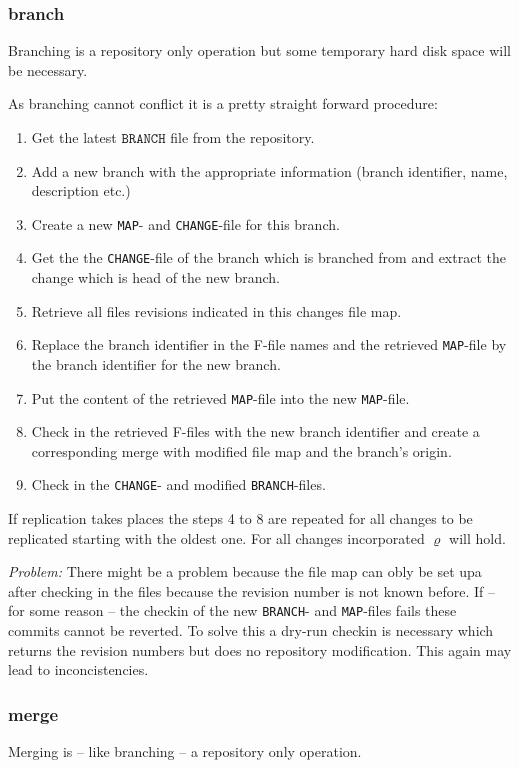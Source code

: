 \documentclass[fleqn, 10pt, a4paper]{report}
\begin{document}
\subsubsection{branch}
Branching is a repository only operation but some temporary
hard disk space will be necessary.

As branching cannot conflict it is a pretty straight forward
procedure:
\begin{enumerate}
\item Get the latest $\mathtt{BRANCH}$ file from the repository.
\item Add a new branch with the appropriate information (branch
identifier, name, description etc.)
\item Create a new \texttt{MAP}- and \texttt{CHANGE}-file for
this branch.
\item Get the the \texttt{CHANGE}-file of the branch which
is branched from and extract the change which is head of the new
branch.
\item Retrieve all files revisions indicated in this changes
file map.
\item Replace the branch identifier in the F-file names and the
retrieved \texttt{MAP}-file by the branch identifier for the
new branch.
\item Put the content of the retrieved \texttt{MAP}-file into
the new \texttt{MAP}-file.
\item Check in the retrieved F-files with the new branch identifier
and create a corresponding merge with modified file map
and the branch's origin.
\item Check in the \texttt{CHANGE}- and modified \texttt{BRANCH}-files.
\end{enumerate}

If replication takes places the steps 4 to 8 are repeated for all
changes to be replicated starting with the oldest one. For all
changes incorporated $\varrho$ will hold.

\emph{Problem:} There might be a problem because the file map can
obly be set upa after checking in the files because the revision
number is not known before. If -- for some reason -- the checkin
of the new \texttt{BRANCH}- and \texttt{MAP}-files fails these
commits cannot be reverted. To solve this a dry-run checkin is necessary
which returns the revision numbers but does no repository modification.
This again may lead to inconcistencies.

\subsubsection{merge}
Merging is -- like branching -- a repository only
operation.
\end{document}
